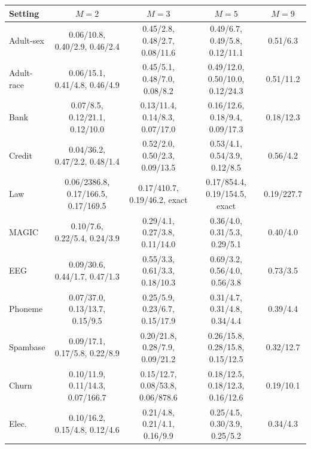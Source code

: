 \begin{tabular}{lcccc}
\toprule
Setting & $M=2$ & $M=3$ & $M=5$ & $M=9$ \\
\midrule
Adult-sex & 0.06/10.8, 0.40/2.9, 0.46/2.4 & 0.45/2.8, 0.48/2.7, 0.08/11.6 & 0.49/6.7, 0.49/5.8, 0.12/11.1 & 0.51/6.3 \\
Adult-race & 0.06/15.1, 0.41/4.8, 0.46/4.9 & 0.45/5.1, 0.48/7.0, 0.08/8.2 & 0.49/12.0, 0.50/10.0, 0.12/24.3 & 0.51/11.2 \\
Bank & 0.07/8.5, 0.12/21.1, 0.12/10.0 & 0.13/11.4, 0.14/8.3, 0.07/17.0 & 0.16/12.6, 0.18/9.4, 0.09/17.3 & 0.18/12.3 \\
Credit & 0.04/36.2, 0.47/2.2, 0.48/1.4 & 0.52/2.0, 0.50/2.3, 0.09/13.5 & 0.53/4.1, 0.54/3.9, 0.12/8.5 & 0.56/4.2 \\
Law & 0.06/2386.8, 0.17/166.5, 0.17/169.5 & 0.17/410.7, 0.19/46.2, exact & 0.17/854.4, 0.19/154.5, exact & 0.19/227.7 \\
MAGIC & 0.10/7.6, 0.22/5.4, 0.24/3.9 & 0.29/4.1, 0.27/3.8, 0.11/14.0 & 0.36/4.0, 0.31/5.3, 0.29/5.1 & 0.40/4.0 \\
EEG & 0.09/30.6, 0.44/1.7, 0.47/1.3 & 0.55/3.3, 0.61/3.3, 0.18/10.3 & 0.69/3.2, 0.56/4.0, 0.56/3.8 & 0.73/3.5 \\
Phoneme & 0.07/37.0, 0.13/13.7, 0.15/9.5 & 0.25/5.9, 0.23/6.7, 0.15/17.9 & 0.31/4.7, 0.31/4.8, 0.34/4.4 & 0.39/4.4 \\
Spambase & 0.09/17.1, 0.17/5.8, 0.22/8.9 & 0.20/21.8, 0.28/7.9, 0.09/21.2 & 0.26/15.8, 0.28/15.8, 0.15/12.5 & 0.32/12.7 \\
Churn & 0.10/11.9, 0.11/14.3, 0.07/166.7 & 0.15/12.7, 0.08/53.8, 0.06/878.6 & 0.18/12.5, 0.18/12.3, 0.16/12.6 & 0.19/10.1 \\
Elec. & 0.10/16.2, 0.15/4.8, 0.12/4.6 & 0.21/4.8, 0.21/4.1, 0.16/9.9 & 0.25/4.5, 0.30/3.9, 0.25/5.2 & 0.34/4.3 \\
\bottomrule
\end{tabular}
